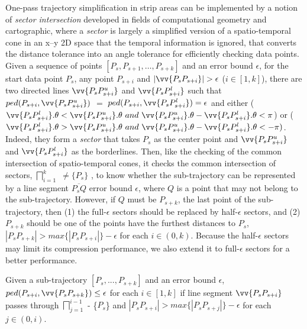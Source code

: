 One-pass trajectory simplification in strip areas can be implemented by a notion of \emph{sector intersection} \cite{Williams:Longest, Sklansky:Cone, Dunham:Cone, Zhao:Sleeve} developed in fields of computational geometry and cartographic, where a \emph{sector} is largely a simplified version of a spatio-temporal cone in an x--y 2D space that the temporal information is ignored, that converts the \ped distance tolerance into an angle tolerance for efficiently checking data points.
%
Given a sequence of points $[P_{s}, P_{s+1}, \ldots, P_{s+k}]$ and an error bound $\epsilon$,
for the start data point $P_s$, any point $P_{s+i}$ and $|\vv{P_sP_{s+i}}|>\epsilon$ ($i\in[1, k]$), there are two directed lines $\vv{P_sP^u_{s+i}}$ and $\vv{P_sP^l_{s+i}}$ such that $ped(P_{s+i}, \vv{P_sP^u_{s+i}})$ $=$ $ped(P_{s+i}, \vv{P_sP^l_{s+i}}) = \epsilon$ and either ($\vv{P_sP^l_{s+i}}.\theta < \vv{P_sP^u_{s+i}}.\theta ~and~\vv{P_sP^u_{s+i}}.\theta - \vv{P_sP^l_{s+i}}.\theta <\pi$) or ($\vv{P_sP^l_{s+i}}.\theta > \vv{P_sP^u_{s+i}}.\theta ~and~ \vv{P_sP^u_{s+i}}.\theta - \vv{P_sP^l_{s+i}}.\theta < -\pi)$. Indeed, they form a \emph{sector}  that takes $P_s$ as the center point and $\vv{P_sP^u_{s+i}}$ and $\vv{P_sP^l_{s+i}}$ as the borderlines.
%
Then, like the checking of the common intersection of spatio-temporal cones, it checks the common intersection of sectors, \ie $\bigsqcap_{i=1}^{k}$ $\ne \{P_s\}$ \cite{Williams:Longest, Sklansky:Cone,Zhao:Sleeve}, to know whether the sub-trajectory can be represented by a line segment $\overline{P_sQ}$ \wrt error bound $\epsilon$, where $Q$ is a point that may not belong to the sub-trajectory. However, if $Q$ must be $P_{s+k}$, the last point of the sub-trajectory, then (1) the full-$\epsilon$ sectors should be replaced by half-$\epsilon$ sectors, and (2) $P_{s+k}$ should be one of the points have the furthest distances to $P_s$, \ie $|P_sP_{s+k}| > max\{|P_sP_{s+i}|\} - \epsilon$ for each $i \in (0, k)$. 
%
Because the half-$\epsilon$ sectors may limit its compression performance, we also extend it to full-$\epsilon$ sectors for a better performance.





\begin{proposition}
	\label{theo-full-sector}
	Given a sub-trajectory $[P_s,...,P_{s+k}]$ and an error bound $\epsilon$, $ped(P_{s+i}, \vv{P_sP_{s+k}})\le \epsilon$ for each $i \in [1,k]$ if line segment $\vv{P_sP_{s+i}}$ passes through $\bigsqcap_{j=1}^{i-1}$ - \{$P_s$\} and $|P_sP_{s+i}| > max\{|P_sP_{s+j}|\} - \epsilon$ for each $j \in (0, i)$.
\end{proposition}

